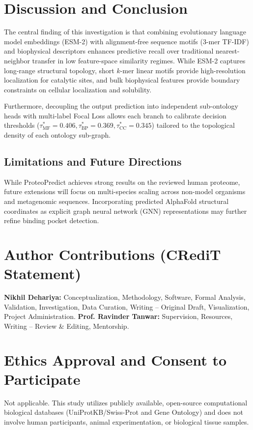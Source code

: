 \documentclass[journal]{IEEEtran}
\begin{document}
\section{Discussion and Conclusion}

The central finding of this investigation is that combining evolutionary language model embeddings (ESM-2) with alignment-free sequence motifs ($3$-mer TF-IDF) and biophysical descriptors enhances predictive recall over traditional nearest-neighbor transfer in low feature-space similarity regimes. While ESM-2 captures long-range structural topology, short $k$-mer linear motifs provide high-resolution localization for catalytic sites, and bulk biophysical features provide boundary constraints on cellular localization and solubility.

Furthermore, decoupling the output prediction into independent sub-ontology heads with multi-label Focal Loss allows each branch to calibrate decision thresholds ($\tau^*_{\text{MF}} = 0.406, \tau^*_{\text{BP}} = 0.369, \tau^*_{\text{CC}} = 0.345$) tailored to the topological density of each ontology sub-graph.

\subsection{Limitations and Future Directions}
While ProteoPredict achieves strong results on the reviewed human proteome, future extensions will focus on multi-species scaling across non-model organisms and metagenomic sequences. Incorporating predicted AlphaFold structural coordinates as explicit graph neural network (GNN) representations may further refine binding pocket detection.

\section*{Author Contributions (CRediT Statement)}
\textbf{Nikhil Dehariya:} Conceptualization, Methodology, Software, Formal Analysis, Validation, Investigation, Data Curation, Writing -- Original Draft, Visualization, Project Administration. \textbf{Prof. Ravinder Tanwar:} Supervision, Resources, Writing -- Review \& Editing, Mentorship.

\section*{Ethics Approval and Consent to Participate}
Not applicable. This study utilizes publicly available, open-source computational biological databases (UniProtKB/Swiss-Prot and Gene Ontology) and does not involve human participants, animal experimentation, or biological tissue samples.
\end{document}
